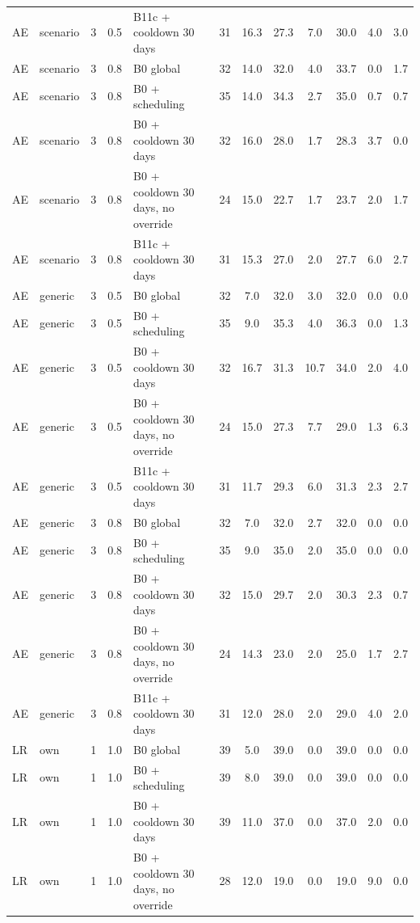 \documentclass[10pt,onecolumn,letterpaper]{article}
\begin{document}
\begin{longtable}{lllllccccccc}
AE & scenario & 3 & 0.5 & B11c + cooldown 30 days & 31 & 16.3 & 27.3 & 7.0 & 30.0 & 4.0 & 3.0 \\
AE & scenario & 3 & 0.8 & B0 global & 32 & 14.0 & 32.0 & 4.0 & 33.7 & 0.0 & 1.7 \\
AE & scenario & 3 & 0.8 & B0 + scheduling & 35 & 14.0 & 34.3 & 2.7 & 35.0 & 0.7 & 0.7 \\
AE & scenario & 3 & 0.8 & B0 + cooldown 30 days & 32 & 16.0 & 28.0 & 1.7 & 28.3 & 3.7 & 0.0 \\
AE & scenario & 3 & 0.8 & B0 + cooldown 30 days, no override & 24 & 15.0 & 22.7 & 1.7 & 23.7 & 2.0 & 1.7 \\
AE & scenario & 3 & 0.8 & B11c + cooldown 30 days & 31 & 15.3 & 27.0 & 2.0 & 27.7 & 6.0 & 2.7 \\
AE & generic & 3 & 0.5 & B0 global & 32 & 7.0 & 32.0 & 3.0 & 32.0 & 0.0 & 0.0 \\
AE & generic & 3 & 0.5 & B0 + scheduling & 35 & 9.0 & 35.3 & 4.0 & 36.3 & 0.0 & 1.3 \\
AE & generic & 3 & 0.5 & B0 + cooldown 30 days & 32 & 16.7 & 31.3 & 10.7 & 34.0 & 2.0 & 4.0 \\
AE & generic & 3 & 0.5 & B0 + cooldown 30 days, no override & 24 & 15.0 & 27.3 & 7.7 & 29.0 & 1.3 & 6.3 \\
AE & generic & 3 & 0.5 & B11c + cooldown 30 days & 31 & 11.7 & 29.3 & 6.0 & 31.3 & 2.3 & 2.7 \\
AE & generic & 3 & 0.8 & B0 global & 32 & 7.0 & 32.0 & 2.7 & 32.0 & 0.0 & 0.0 \\
AE & generic & 3 & 0.8 & B0 + scheduling & 35 & 9.0 & 35.0 & 2.0 & 35.0 & 0.0 & 0.0 \\
AE & generic & 3 & 0.8 & B0 + cooldown 30 days & 32 & 15.0 & 29.7 & 2.0 & 30.3 & 2.3 & 0.7 \\
AE & generic & 3 & 0.8 & B0 + cooldown 30 days, no override & 24 & 14.3 & 23.0 & 2.0 & 25.0 & 1.7 & 2.7 \\
AE & generic & 3 & 0.8 & B11c + cooldown 30 days & 31 & 12.0 & 28.0 & 2.0 & 29.0 & 4.0 & 2.0 \\
LR & own & 1 & 1.0 & B0 global & 39 & 5.0 & 39.0 & 0.0 & 39.0 & 0.0 & 0.0 \\
LR & own & 1 & 1.0 & B0 + scheduling & 39 & 8.0 & 39.0 & 0.0 & 39.0 & 0.0 & 0.0 \\
LR & own & 1 & 1.0 & B0 + cooldown 30 days & 39 & 11.0 & 37.0 & 0.0 & 37.0 & 2.0 & 0.0 \\
LR & own & 1 & 1.0 & B0 + cooldown 30 days, no override & 28 & 12.0 & 19.0 & 0.0 & 19.0 & 9.0 & 0.0 \\

\end{longtable}
\end{document}

